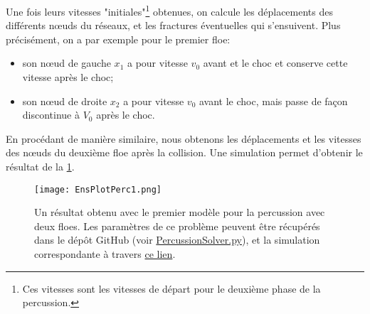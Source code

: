 Une fois leurs vitesses "initiales"\footnote{Ces vitesses sont les vitesses de départ pour le deuxième phase de la percussion.} obtenues, on calcule les déplacements des différents n\oe{}uds du réseaux, et les fractures éventuelles qui s'ensuivent. Plus précisément, on a par exemple pour le premier floe:
\begin{itemize}
    \item son n\oe{}ud de gauche $x_1$ a pour vitesse $v_0$ avant et le choc et conserve cette vitesse après le choc;
    \item son n\oe{}ud de droite $x_2$ a pour vitesse $v_0$ avant le choc, mais passe de façon discontinue à $V_0$ après le choc.
\end{itemize}
En procédant de manière similaire, nous obtenons les déplacements et les vitesses des n\oe{}uds du deuxième floe après la collision. Une simulation permet d'obtenir le résultat de la \cref{fig:frac1d3}.
\begin{figure}[!h]
    \centering
    \texttt{[image: EnsPlotPerc1.png]}
    \caption{Un résultat obtenu avec le premier modèle pour la percussion avec deux floes. Les paramètres de ce problème peuvent être récupérés dans le dépôt GitHub (voir \href{https://github.com/desmond-rn/ice-floes/blob/master/code/simu1D/PercussionSolver.py}{PercussionSolver.py}), et la simulation correspondante à travers \href{https://seafile.unistra.fr/f/f3dada07cccf4bd6965e/}{ce lien}.}
    \label{fig:frac1d3}
\end{figure}





